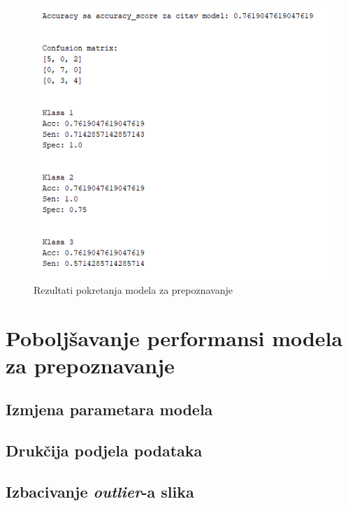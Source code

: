 \documentclass[12pt,a4paper]{article}
\begin{document}
\begin{figure}[H]

\center
\includegraphics[scale=0.9]{slikaTest.png}
\caption{Rezultati pokretanja modela za prepoznavanje}
	
\end{figure}

\newpage

\section{Poboljšavanje performansi modela za prepoznavanje}

\subsection{Izmjena parametara modela}

\subsection{Drukčija podjela podataka}

\subsection{Izbacivanje \textit{outlier}-a slika}
\end{document}
